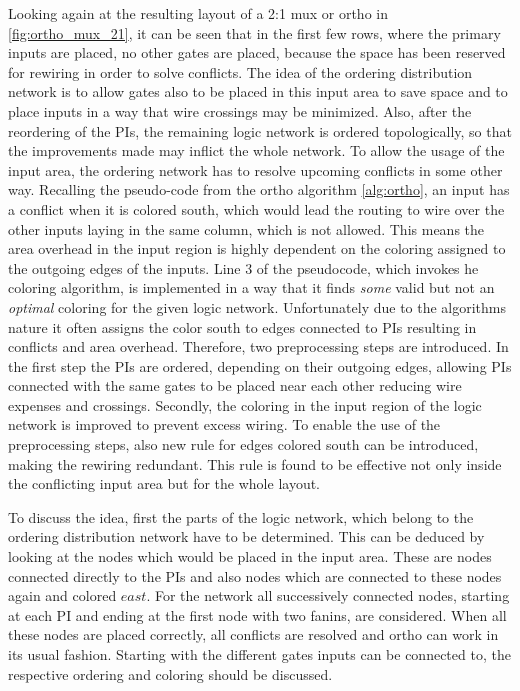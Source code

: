 Looking again at the resulting layout of a 2:1 mux or ortho in \ref{fig:ortho_mux_21}, it can be seen that in the first few rows, where the primary inputs are placed, no other gates are placed, because the space has been reserved for rewiring in order to solve conflicts. The idea of the ordering distribution network is to allow gates also to be placed in this input area to save space and to place inputs in a way that wire crossings may be minimized. Also, after the reordering of the PIs, the remaining logic network is ordered topologically, so that the improvements made may inflict the whole network. To allow the usage of the input area, the ordering network has to resolve upcoming conflicts in some other way. Recalling the pseudo-code from the ortho algorithm \ref{alg:ortho}, an input has a conflict when it is colored south, which would lead the routing to wire over the other inputs laying in the same column, which is not allowed. This means the area overhead in the input region is highly dependent on the coloring assigned to the outgoing edges of the inputs. Line $3$ of the pseudocode, which invokes he coloring algorithm, is implemented in a way that it finds \textit{some} valid but not an \textit{optimal} coloring for the given logic network. Unfortunately due to the algorithms nature it often assigns the color south to edges connected to PIs resulting in conflicts and area overhead.
Therefore, two preprocessing steps are introduced. In the first step the PIs are ordered, depending on their outgoing edges, allowing PIs connected with the same gates to be placed near each other reducing wire expenses and crossings. Secondly, the coloring in the input region of the logic network is improved to prevent excess wiring. To enable the use of the preprocessing steps, also new rule for edges colored south can be introduced, making the rewiring redundant. This rule is found to be effective not only inside the conflicting input area but for the whole layout.

To discuss the idea, first the parts of the logic network, which belong to the ordering distribution network have to be determined. This can be deduced by looking at the nodes which would be placed in the input area. These are nodes connected directly to the PIs and also nodes which are connected to these nodes again and colored $east$. For the network all successively connected nodes, starting at each PI and ending at the first node with two fanins, are considered. When all these nodes are placed correctly, all conflicts are resolved and ortho can work in its usual fashion. Starting with the different gates inputs can be connected to, the respective ordering and coloring should be discussed.

